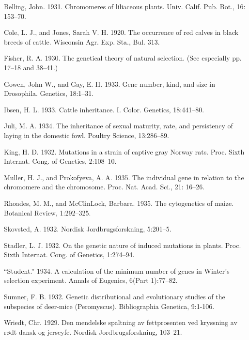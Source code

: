 \begin{hangparas}{0.5in}{1}%
Belling, John. 1931. Chromomeres of liliaceous plants. Univ. Calif. Pub. Bot., 16:
153--70.

Cole, L. J., and Jones, Sarah V. H. 1920. The occurrence of red calves in black
breeds of cattle. Wisconsin Agr. Exp. Sta., Bul. 313.

Fisher, R. A. 1930. The genetical theory of natural selection. (See especially pp.
17--18 and 38--41.)

Gowen, John W., and Gay, E. H. 1933. Gene number, kind, and size in Drosophila.
Genetics, 18:1--31.

Ibsen, H. L. 1933. Cattle inheritance. I. Color. Genetics, 18:441--80.

Juli, M. A. 1934. The inheritance of sexual maturity, rate, and persistency of laying
in the domestic fowl. Poultry Science, 13:286--89.

King, H. D. 1932. Mutations in a strain of captive gray Norway rats. Proc. Sixth
Internat. Cong. of Genetics, 2:108--10.

Muller, H. J., and Prokofyeva, A. A. 1935. The individual gene in relation to the
chromomere and the chromosome. Proc. Nat. Acad. Sci., 21: 16--26.

Rhoades, M. M., and McClinLock, Barbara. 1935. The cytogenetics of maize. Botanical
Review, 1:292--325.

Skovsted, A. 1932. Nordisk Jordbrugsforskning, 5:201--5.

Stadler, L. J. 1932. On the genetic nature of induced mutations in plants. Proc.
Sixth Internat. Cong. of Genetics, 1:274--94.

``Student.'' 1934. A calculation of the minimum number of genes in Winter's
selection experiment. Annals of Eugenics, 6(Part 1):77--82.

Sumner, F. B. 1932. Genetic distributional and evolutionary studies of the subspecies
of deer-mice (Peromyscus). Bibliographia Genetica, 9:1-106.

Wriedt, Chr. 1929. Den mendelske spaltning av fettprosenten ved kryssning av r{\o}dt
dansk og jerseyfe. Nordisk Jordbrugsforskning, 103--21.
\end{hangparas}